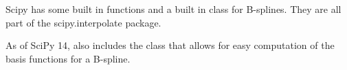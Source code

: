 \begin{comment}

First, notice that for splines of order $2$ and higher, we actually compute the values of some splines multiple times.
A simple way to avoid this is to figure out which of the 0-order splines we will actually use in our computation, compute them all, then compute all the needed splines of order 1, 2, etc.

There is also some redundant computation in the computation of the coefficients used at each stage of the recursion.
This can be eliminated by using good control structure and a temporary variable.

We will label the left and right coefficients in the formula $L$ and $R$ respectively, so we have $L(i, k, x) = \frac{x - t_i}{t_{i + k} - t_i}$ and $R(i, p, u) = \frac{t_{i + k + 1} - x}{t_{i + k + 1} - t_{i + 1}}$.
Notice that $L(i + 1, k, x) = 1 - R(i, k, x)$.
We can eliminate much of the duplicate computation by computing the new left hand side coefficient the iteration before we actually need it.
This avoids nearly all the repeated computation.

\begin{problem}
Write a function that uses loops instead of recursion to compute the values for all the b-spline basis functions of a given power $k$ for a given array of $t$ values.
Return the answer as a two dimensional array with the results for each polynomial stored in each of the rows of the array.
\end{problem}

It is worth noting that you can remove further excess computation when evaluating a single function and even further when evaluating a single function at a single point.
This can be done by figuring out in advance which of the $N_{i,k}$ will be nonzero and only iterating over those terms.
This approach may or may not be faster depending on the form of the problem.

\end{comment}

Scipy has some built in functions and a built in class for B-splines.
They are all part of the scipy.interpolate package.

As of SciPy 14,  also includes the  class that allows for easy computation of the basis functions for a B-spline.

